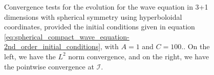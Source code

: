 \begin{figure}[h]
\begin{subfigure}[b]{0.45\textwidth}
    \end{subfigure}
    \caption{Convergence tests for the evolution for the wave equation in 3+1 dimensions with spherical symmetry using hyperboloidal coordinates, provided the initial conditions given in equation \eqref{eq:spherical_compact_wave_equation-2nd_order_initial_conditions}, with $A = 1$ and $C = 100$.. On the left, we have the $L^2$ norm convergence, and on the right, we have the pointwise convergence at $\mathscr{I}$.}
    \label{fig:spherical_compact_wave_equation-2nd_order-convergence}
\end{figure}
